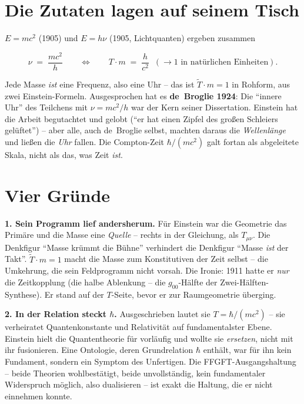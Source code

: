 \documentclass[11pt]{report}
\begin{document}
\section{Die Zutaten lagen auf seinem Tisch}

$E = mc^2$ (1905) und $E = h\nu$ (1905, Lichtquanten) ergeben
zusammen

\begin{equation}
  \nu \;=\; \frac{mc^2}{h}
  \qquad\Longleftrightarrow\qquad
  T \cdot m \;=\; \frac{h}{c^2} \;\;(\to 1
  \text{ in natürlichen Einheiten}).
\end{equation}

Jede Masse \emph{ist} eine Frequenz, also eine Uhr -- das ist
$\tilde T \cdot m = 1$ in Rohform, aus zwei Einstein-Formeln.
Ausgesprochen hat es \textbf{de~Broglie 1924}: Die
\enquote{innere Uhr} des Teilchens mit $\nu = mc^2/h$ war der Kern
seiner Dissertation. Einstein hat die Arbeit begutachtet und
gelobt (\enquote{er hat einen Zipfel des großen Schleiers
gelüftet}) -- aber alle, auch de~Broglie selbst, machten daraus die
\emph{Wellenlänge} und ließen die \emph{Uhr} fallen. Die
Compton-Zeit $\hbar/(mc^2)$ galt fortan als abgeleitete Skala,
nicht als das, was Zeit \emph{ist}.

\section{Vier Gründe}

\textbf{1. Sein Programm lief andersherum.} Für Einstein war die
Geometrie das Primäre und die Masse eine \emph{Quelle} -- rechts in
der Gleichung, als $T_{\mu\nu}$. Die Denkfigur \enquote{Masse
krümmt die Bühne} verhindert die Denkfigur \enquote{Masse
\emph{ist} der Takt}. $\tilde T \cdot m = 1$ macht die Masse zum
Konstitutiven der Zeit selbst -- die Umkehrung, die sein
Feldprogramm nicht vorsah. Die Ironie: 1911 hatte er \emph{nur} die
Zeitkopplung (die halbe Ablenkung -- die $g_{00}$-Hälfte der
Zwei-Hälften-Synthese). Er stand auf der $T$-Seite, bevor er zur
Raumgeometrie überging.

\textbf{2. In der Relation steckt $\hbar$.} Ausgeschrieben lautet
sie $T = \hbar/(mc^2)$ -- sie verheiratet Quantenkonstante und
Relativität auf fundamentalster Ebene. Einstein hielt die
Quantentheorie für vorläufig und wollte sie \emph{ersetzen}, nicht
mit ihr fusionieren. Eine Ontologie, deren Grundrelation $\hbar$
enthält, war für ihn kein Fundament, sondern ein Symptom des
Unfertigen. Die FFGFT-Ausgangshaltung -- beide Theorien
wohlbestätigt, beide unvollständig, kein fundamentaler Widerspruch
möglich, also dualisieren -- ist exakt die Haltung, die er nicht
einnehmen konnte.
\end{document}
